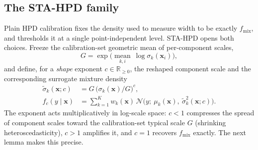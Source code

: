 \documentclass[10pt,twocolumn,a4paper]{article}
\begin{document}
\subsection{The STA-HPD family}
Plain HPD calibration fixes the density used to measure width to be exactly $f_{\mathrm{mix}}$, and
thresholds it at a single point-independent level. STA-HPD opens both choices. Freeze the
calibration-set geometric mean of per-component scales,
\begin{equation}
G = \exp\!\Big(\operatorname*{mean}_{k,i}\ \log\sigma_k(\bm x_i)\Big),
\end{equation}
and define, for a \emph{shape} exponent $c\in\mathbb R_{\ge0}$, the reshaped component scale and the
corresponding surrogate mixture density
\begin{align}
\tilde\sigma_k(\bm x; c) &= G\,\big(\sigma_k(\bm x)/G\big)^{c}, \label{eq:shape}\\
f_c(y\mid\bm x) &= \sum_{k=1}^K w_k(\bm x)\,\mathcal N\big(y;\ \mu_k(\bm x),\ \tilde\sigma_k^2(\bm x;c)\big). \label{eq:fc}
\end{align}
The exponent acts multiplicatively in log-scale space: $c<1$ compresses the spread of component
scales toward the calibration-set typical scale $G$ (shrinking heteroscedasticity), $c>1$ amplifies
it, and $c=1$ recovers $f_{\mathrm{mix}}$ exactly. The next lemma makes this precise.
\end{document}
